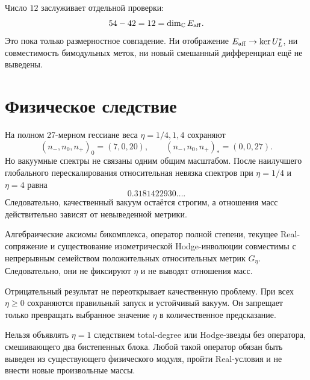 Число $12$ заслуживает отдельной проверки:
\begin{equation}
 54-42=12=\dim_{\mathbb C}E_{\rm aff}.
 \label{eq:v7-bicomplex-affine-dimension-clue}
\end{equation}
Это пока только размерностное совпадение. Ни отображение
$E_{\rm aff}\to\ker U_L^*$, ни совместимость бимодульных меток, ни новый
смешанный дифференциал ещё не выведены.

\section{Физическое следствие}

На полном 27-мерном гессиане веса $\eta=1/4,1,4$ сохраняют
\begin{equation}
 (n_-,n_0,n_+)_{0}=(7,0,20),
 \qquad
 (n_-,n_0,n_+)_{*}=(0,0,27).
\end{equation}
Но вакуумные спектры не связаны одним общим масштабом. После наилучшего
глобального перескалирования относительная невязка спектров при
$\eta=1/4$ и $\eta=4$ равна
\begin{equation}
 0.3181422930\ldots.
 \label{eq:v7-bicomplex-nonhomothetic-spectrum}
\end{equation}
Следовательно, качественный вакуум остаётся строгим, а отношения масс
действительно зависят от невыведенной метрики.

\begin{theorem}
Алгебраические аксиомы бикомплекса, оператор полной степени, текущее
Real-сопряжение и существование изометрической Hodge-инволюции совместимы с
непрерывным семейством положительных относительных метрик $G_\eta$.
Следовательно, они не фиксируют $\eta$ и не выводят отношения масс.
\end{theorem}

\begin{remark}
Отрицательный результат не переоткрывает качественную проблему. При всех
$\eta\ge0$ сохраняются правильный запуск и устойчивый вакуум. Он запрещает
только превращать выбранное значение $\eta$ в количественное предсказание.
\end{remark}

\begin{nogocriterion}
Нельзя объявлять $\eta=1$ следствием total-degree или Hodge-звезды без
оператора, смешивающего два бистепенных блока. Любой такой оператор обязан
быть выведен из существующего физического модуля, пройти Real-условия и не
внести новые произвольные массы.
\end{nogocriterion}

